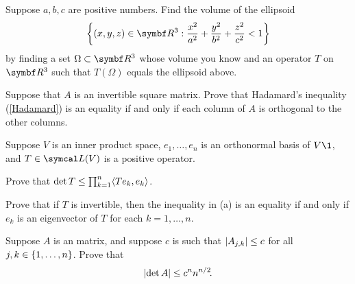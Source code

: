 \begin{exercises}

\exercise
Suppose $a, b, c$ are positive numbers.  Find the volume of the ellipsoid
\[
\br[\bigg]{ (x, y, z) \in \R{3}: \frac{x^2}{a^2} + \frac{y^2}{b^2} + \frac{z^2}{c^2} < 1 }
\]
by finding a set $\Omega \subset \R{3}$ whose volume you know and an operator
$T$ on $\R{3}$ such that $T(\Omega)$ equals the ellipsoid above.


\exercise
Suppose that $A$ is an invertible square matrix. Prove that Hadamard's \mbox{inequality} (\ref{Hadamard}) is an equality if and only if each column of $A$ is orthogonal to the other columns.\label{7HadEq}


\exercise
Suppose $V$ is an inner product space, $e_1, \ldots, e_n$ is an orthonormal basis of $V\1$, and $T \in \L(V)$ is a positive operator.
\begin{subtheorem}
\item
Prove that $\det T \le \prod_{k=1}^n \langle Te_k, e_k\rangle$.
\item
Prove that if $T$ is invertible, then the inequality in (a) is an equality if and only if $e_k$ is an eigenvector of $T$ for each
$k = 1, \ldots, n$.
\end{subtheorem}
\exercisesubtheoremend


\exercise
Suppose $A$ is an  matrix, and suppose $c$ is such that $\lvert A_{j,k}\rvert \le c$ for all $j, k \in \{1, \ldots, n\}$. Prove that \label{2Had}
\[
\lvert\det A\rvert \le c^n n^{n/2}\!.
\]
\exercisedisplayend
{} %



\end{exercises}
